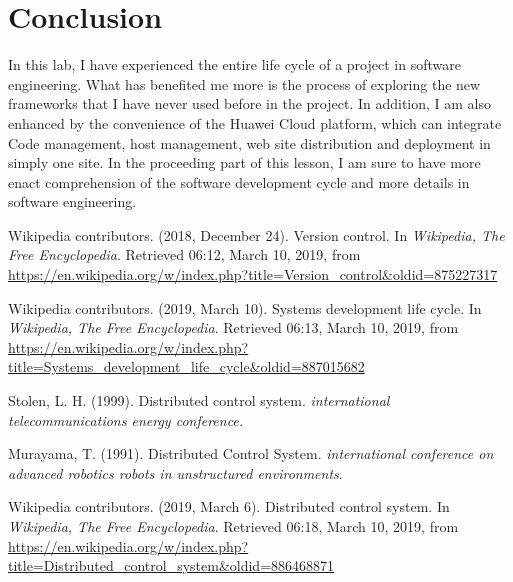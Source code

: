 \documentclass[a4paper]{report}
\begin{document}
\chapter{Conclusion}
In this lab, I have experienced the entire life cycle of a project in software engineering. What has benefited me more is the process of exploring the new frameworks that I have never used before in the project. In addition, I am also enhanced by the convenience of the Huawei Cloud platform, which can integrate Code management, host management, web site distribution and deployment in simply one site. In the proceeding part of this lesson, I am sure to have more enact comprehension of the software development cycle and more details in software engineering.
\begin{thebibliography}{A}

Wikipedia contributors. (2018, December 24). Version control. In \emph{Wikipedia, The Free Encyclopedia}. Retrieved 06:12, March 10, 2019, from \url{https://en.wikipedia.org/w/index.php?title=Version_control&oldid=875227317}

Wikipedia contributors. (2019, March 10). Systems development life cycle. In \emph{Wikipedia, The Free Encyclopedia}. Retrieved 06:13, March 10, 2019, from \url{https://en.wikipedia.org/w/index.php?title=Systems_development_life_cycle&oldid=887015682}

Stolen, L. H. (1999). Distributed control system. \emph{international telecommunications energy conference.}

Murayama, T. (1991). Distributed Control System. \emph{international conference on advanced robotics robots in unstructured environments}.

Wikipedia contributors. (2019, March 6). Distributed control system. In \emph{Wikipedia, The Free Encyclopedia}. Retrieved 06:18, March 10, 2019, from \url{https://en.wikipedia.org/w/index.php?title=Distributed_control_system&oldid=886468871}

\end{thebibliography}
\end{document}

